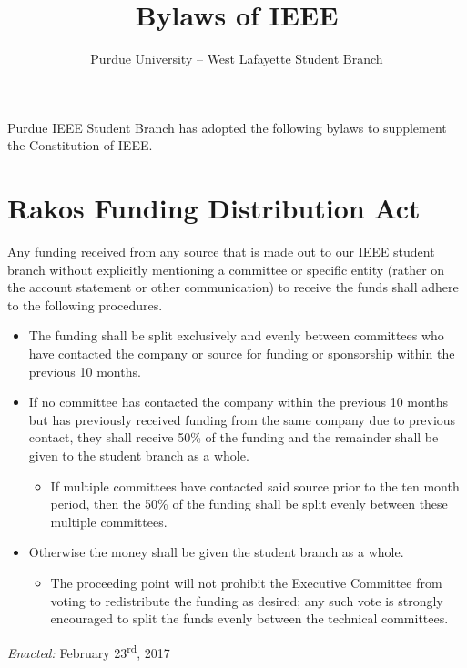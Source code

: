 \documentclass[12pt]{constitution}
\title{Bylaws of IEEE}
\author{Purdue University -- West Lafayette Student Branch}
\date{}
\begin{document}

\titlecontentspage
\newpage


\label{art:preamble}

Purdue IEEE Student Branch has adopted the following bylaws to supplement the Constitution of IEEE.

\label{art:excom}


\section{Rakos Funding Distribution Act}
\label{byl:Rakos}
Any funding received from any source that is made out to our IEEE student branch without explicitly mentioning a committee or specific entity (rather on the account statement or other communication) to receive the funds shall adhere to the following procedures.
\begin{itemize}
    \item The funding shall be split exclusively and evenly between committees who have contacted the company or source for funding or sponsorship within the previous 10 months.
    \item If no committee has contacted the company within the previous 10 months but has previously received funding from the same company due to previous contact, they shall receive 50\% of the funding and the remainder shall be given to the student branch as a whole.
    \begin{itemize}
        \item If multiple committees have contacted said source prior to the ten month period, then the 50\% of the funding shall be split evenly between these multiple committees.
    \end{itemize}
    \item Otherwise the money shall be given the student branch as a whole.
    \begin{itemize}
        \item The proceeding point will not prohibit the Executive Committee from voting to redistribute the funding as desired; any such vote is strongly encouraged to split the funds evenly between the technical committees. 
    \end{itemize}
\end{itemize}
\textit{Enacted:} February 23\textsuperscript{rd}, 2017


\end{document}
